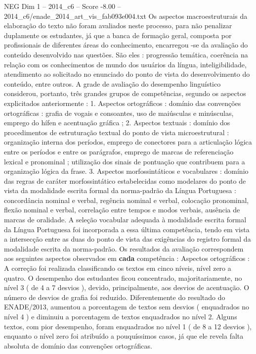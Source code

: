\begin{textsample}{NEG Dim 1 – 2014\_c6 – Score -8.00 – 2014\_c6/enade\_2014\_art\_vis\_fab093e004.txt}
Os aspectos macroestruturais da elaboração do texto não foram avaliados neste processo, para não penalizar duplamente os estudantes, já que a banca de formação geral, composta por profissionais de diferentes áreas do conhecimento, encarregou -se da avaliação do conteúdo desenvolvido nas questões.
São eles : progressão temática, coerência na relação com os conhecimentos de mundo dos usuários da língua, inteligibilidade, atendimento ao solicitado no enunciado do ponto de vista do desenvolvimento do conteúdo, entre outros.
A grade de avaliação do desempenho linguístico considerou, portanto, três grandes grupos de competências, segundo os aspectos explicitados anteriormente : 1.
Aspectos ortográficos : domínio das convenções ortográficas : grafia de vogais e consoantes, uso de maiúsculas e minúsculas, emprego do hífen e acentuação gráfica ; 2.
Aspectos textuais : domínio dos procedimentos de estruturação textual do ponto de vista microestrutural : organização interna dos períodos, emprego de conectores para a articulação lógica entre os períodos e entre os parágrafos, emprego de marcas de referenciação lexical e pronominal ; utilização dos sinais de pontuação que contribuem para a organização lógica da frase. 3.
Aspectos morfossintáticos e vocabulares : domínio das regras de caráter morfossintático estabelecidas como modelares do ponto de vista da modalidade escrita formal da norma-padrão da Língua Portuguesa : concordância nominal e verbal, regência nominal e verbal, colocação pronominal, flexão nominal e verbal, correlação entre tempos e modos verbais, ausência de marcas de oralidade.
A seleção vocabular adequada à modalidade escrita formal da Língua Portuguesa foi incorporada a essa última competência, tendo em vista a intersecção entre as duas do ponto de vista das exigências do registro formal da modalidade escrita da norma-padrão.
Os resultados da avaliação correspondem aos seguintes aspectos observados em \textbf{cada} competência : Aspectos ortográficos : A correção foi realizada classificando os textos em cinco níveis, nível zero a quatro.
O desempenho dos estudantes ficou concentrado, majoritariamente, no nível 3 ( de 4 a 7 desvios ), devido, principalmente, aos desvios de acentuação.
O número de desvios de grafia foi reduzido.
Diferentemente do resultado do ENADE/2013, aumentou a porcentagem de textos sem desvios ( enquadrados no nível 4 ) e diminuiu a porcentagem de textos enquadrados no nível 2.
Alguns textos, com pior desempenho, foram enquadrados no nível 1 ( de 8 a 12 desvios ), enquanto o nível zero foi atribuído a pouquíssimos casos, já que ele revela falta absoluta de domínio das convenções ortográficas.

\end{textsample}
